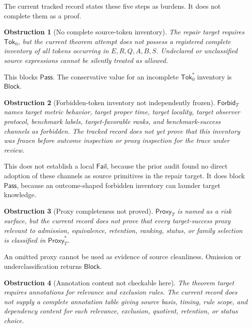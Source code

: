 \documentclass[11pt]{article}
\newcommand{\SrcTok}{\mathsf{Tok}_{0}}
\newcommand{\ForbidT}{\mathsf{Forbid}_{T}}
\newcommand{\ProxyT}{\mathsf{Proxy}_{T}}
\newcommand{\Pass}{\mathsf{Pass}}
\newcommand{\Fail}{\mathsf{Fail}}
\newcommand{\Block}{\mathsf{Block}}
\newtheorem{obstruction}{Obstruction}
\begin{document}
The current tracked record states these five steps as burdens. It does not
complete them as a proof.

\begin{obstruction}[No complete source-token inventory]
The repair target requires \(\SrcTok\), but the current theorem attempt
does not possess a registered complete inventory of all tokens occurring in
\(E,R,Q,A,B,S\). Undeclared or unclassified source expressions cannot be
silently treated as allowed.
\end{obstruction}

This blocks \(\Pass\). The conservative value for an incomplete
\(\SrcTok^{*}\) inventory is \(\Block\).

\begin{obstruction}[Forbidden-token inventory not independently frozen]
\(\ForbidT\) names target metric behavior, target proper time, target
locality, target observer protocol, benchmark labels, target-favorable
ranks, and benchmark-success channels as forbidden. The tracked record does
not yet prove that this inventory was frozen before outcome inspection or
proxy inspection for the trace under review.
\end{obstruction}

This does not establish a local \(\Fail\), because the prior audit found no
direct adoption of these channels as source primitives in the repair target.
It does block \(\Pass\), because an outcome-shaped forbidden inventory can
launder target knowledge.

\begin{obstruction}[Proxy completeness not proved]
\(\ProxyT\) is named as a risk surface, but the current record does not
prove that every target-success proxy relevant to admission, equivalence,
retention, ranking, status, or family selection is classified in
\(\ProxyT^{*}\).
\end{obstruction}

An omitted proxy cannot be used as evidence of source cleanliness. Omission
or underclassification returns \(\Block\).

\begin{obstruction}[Annotation content not checkable here]
The theorem target requires annotations for relevance and exclusion rules.
The current record does not supply a complete annotation table giving source
basis, timing, rule scope, and dependency content for each relevance,
exclusion, quotient, retention, or status choice.
\end{obstruction}
\end{document}
